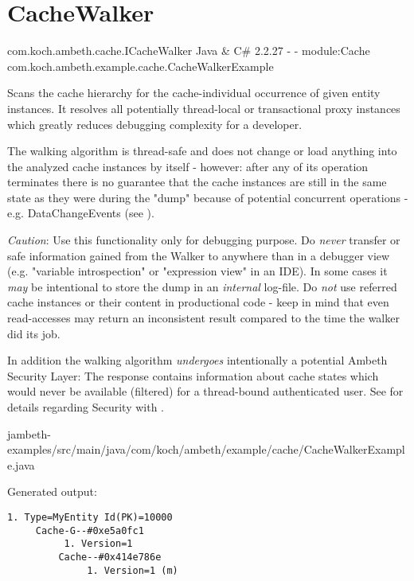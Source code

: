 \section{CacheWalker}
\label{feature:CacheWalker}
\ClearAPI
\feature
	{com.koch.ambeth.cache.ICacheWalker}
	{Java \& C\#}
	{2.2.27}
	{-}
	{-}
	{module:Cache}
	{com.koch.ambeth.example.cache.CacheWalkerExample}

Scans the cache hierarchy for the cache-individual occurrence of given entity instances. It resolves all potentially thread-local or transactional proxy instances which greatly reduces debugging complexity for a developer.\newline

The walking algorithm is thread-safe and does not change or load anything into the analyzed cache instances by itself - however: after any of its operation terminates there is no guarantee that the cache instances are still in the same state as they were during the "dump" because of potential concurrent operations - e.g. DataChangeEvents (see ).\newline

\emph{Caution}: Use this functionality only for debugging purpose. Do \emph{never} transfer or safe information gained from the Walker to anywhere than in a debugger view (e.g. "variable introspection" or "expression view" in an IDE). In some cases it \emph{may} be intentional to store the dump in an \emph{internal} log-file. Do \emph{not} use referred cache instances or their content in productional code - keep in mind that even read-accesses may return an inconsistent result compared to the time the walker did its job.\newline

In addition the walking algorithm \emph{undergoes} intentionally a potential Ambeth Security Layer: The response contains information about cache states which would never be available (filtered) for a thread-bound authenticated user. See  for details regarding Security with .

	{jambeth-examples/src/main/java/com/koch/ambeth/example/cache/CacheWalkerExample.java}

Generated output:

\begin{lstlisting}[style=Console]
	1. Type=MyEntity Id(PK)=10000
	 Cache-G--#0xe5a0fc1
		  1. Version=1
		 Cache--#0x414e786e
			  1. Version=1 (m)
\end{lstlisting}

